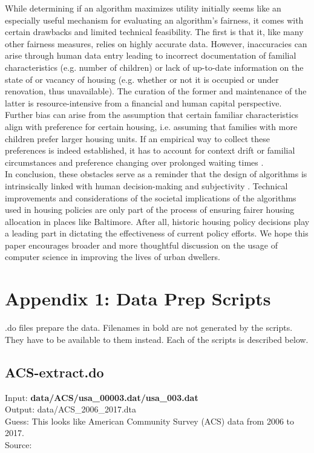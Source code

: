 \documentclass[11pt]{article}
\begin{document}
\newline
While determining if an algorithm maximizes utility initially seems like an especially useful mechanism for evaluating an algorithm’s fairness, it comes with certain drawbacks and limited technical feasibility. The first is that it, like many other fairness measures, relies on highly accurate data. However, inaccuracies can arise through human data entry leading to incorrect documentation of familial characteristics (e.g. number of children) or lack of up-to-date information on the state of or vacancy of housing (e.g. whether or not it is occupied or under renovation, thus unavailable). The curation of the former and maintenance of the latter is resource-intensive from a financial and human capital perspective. \\
\newline
Further bias can arise from the assumption that certain familiar characteristics align with preference for certain housing, i.e. assuming that families with more children prefer larger housing units. If an empirical way to collect these preferences is indeed established, it has to account for context drift or familial circumstances and preference changing over prolonged waiting times \cite{conceptdrift}. \\
\newline
In conclusion, these obstacles serve as a reminder that the design of algorithms is intrinsically linked with human decision-making and subjectivity \cite{humanerror}. Technical improvements and considerations of the societal implications of the algorithms used in housing policies are only part of the process of ensuring fairer housing allocation in places like Baltimore. After all, historic housing policy decisions play a leading part in dictating the effectiveness of current policy efforts. We hope this paper encourages broader and more thoughtful discussion on the usage of computer science in improving the lives of urban dwellers. 

\newpage
\section{Appendix 1: Data Prep Scripts}
.do files prepare the data. Filenames in bold are not generated by the scripts. They have to be available to them instead. Each of the scripts is described below.

\subsection{ACS-extract.do}
Input: \textbf{data/ACS/usa\_00003.dat/usa\_003.dat} \\
Output: data/ACS\_2006\_2017.dta \\
Guess: This looks like American Community Survey (ACS) data from 2006 to 2017. \\
Source: 
\end{document}
